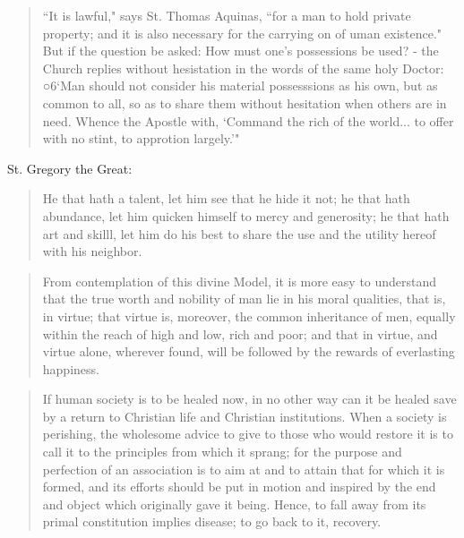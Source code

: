\begin{quote}
  ``It is lawful," says St. Thomas Aquinas, ``for a man to hold private property; and it is also necessary for the carrying on of uman existence." But if the question be asked: How must one's possessions be used? - the Church replies without hesistation in the words of the same holy Doctor: ○6`Man should not consider his material possesssions as his own, but as common to all, so as to share them without hesitation when others are in need. Whence the Apostle with, `Command the rich of the world... to offer with no stint, to approtion largely.'"
\end{quote}

St. Gregory the Great:
\begin{quote}
	He that hath a talent, let him see that he hide it not; he that hath abundance, let him quicken himself to mercy and generosity; he that hath art and skilll, let him do his best to share the use and the utility hereof with his neighbor.
\end{quote}


\begin{quote}
	From contemplation of this divine Model, it is more easy to understand that the true worth and nobility of man lie in his moral qualities, that is, in virtue; that virtue is, moreover, the common inheritance of men, equally within the reach of high and low, rich and poor; and that in virtue, and virtue alone, wherever found, will be followed by the rewards of everlasting happiness.
\end{quote}

\begin{quote}
  If human society is to be healed now, in no other way can it be healed save by a return to Christian life and Christian institutions. When a society is perishing, the wholesome advice to give to those who would restore it is to call it to the principles from which it sprang; for the purpose and perfection of an association is to aim at and to attain that for which it is formed, and its efforts should be put in motion and inspired by the end and object which originally gave it being. Hence, to fall away from its primal constitution implies disease; to go back to it, recovery.
\end{quote}

